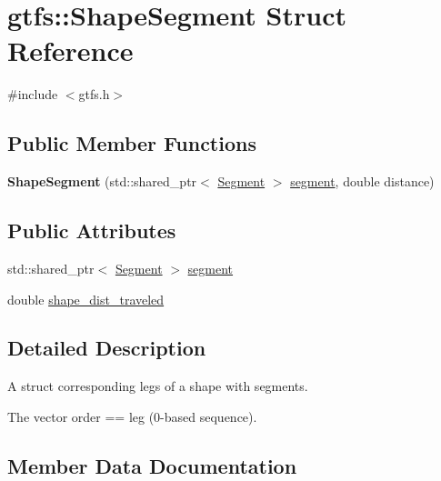 \hypertarget{structgtfs_1_1ShapeSegment}{}\section{gtfs\+:\+:Shape\+Segment Struct Reference}
\label{structgtfs_1_1ShapeSegment}


{\ttfamily \#include $<$gtfs.\+h$>$}

\subsection*{Public Member Functions}
\begin{DoxyCompactItemize}
\item 
\mbox{\label{structgtfs_1_1ShapeSegment_af1bdb1504d16a49ab6ac8ea34da59c5f}} 
{\bfseries Shape\+Segment} (std\+::shared\+\_\+ptr$<$ \hyperlink{classgtfs_1_1Segment}{Segment} $>$ \hyperlink{structgtfs_1_1ShapeSegment_a3253b76a15e2645f894a75be55006e09}{segment}, double distance)
\end{DoxyCompactItemize}
\subsection*{Public Attributes}
\begin{DoxyCompactItemize}
\item 
std\+::shared\+\_\+ptr$<$ \hyperlink{classgtfs_1_1Segment}{Segment} $>$ \hyperlink{structgtfs_1_1ShapeSegment_a3253b76a15e2645f894a75be55006e09}{segment}
\item 
double \hyperlink{structgtfs_1_1ShapeSegment_a64afdd03235b9bc256fc18652c6f9c47}{shape\+\_\+dist\+\_\+traveled}
\end{DoxyCompactItemize}


\subsection{Detailed Description}
A struct corresponding legs of a shape with segments.

The vector order == leg (0-\/based sequence). 

\subsection{Member Data Documentation}
\mbox{\label{structgtfs_1_1ShapeSegment_a3253b76a15e2645f894a75be55006e09}} 
